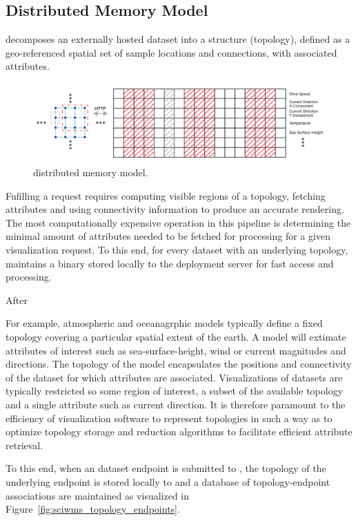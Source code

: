 \subsection{Distributed Memory Model}
\sciwms{} decomposes an externally hosted dataset into a structure
(topology), defined as a geo-referenced spatial set of sample
locations and connections, with associated attributes.

\begin{figure}[ht!]
  \centering
  \includegraphics[width=\textwidth]{../figs/topology_memModel}
  \caption{\sciwms{} distributed memory model.}
  \label{fig:sciwms_mem_model}
\end{figure}

Fufilling a \wms{} request requires computing visible regions of a
topology, fetching attributes and using connectivity information to
produce an accurate rendering. The most computationally expensive
operation in this pipeline is determining the minimal amount of
attributes needed to be fetched for processing for a given
visualization request. To this end, for every dataset with an
underlying \ugrid{} topology, \sciwms{} maintains a binary \rtree{}
stored locally to the \sciwms{} deployment server for fast access and
processing.

After

For example, atmospheric and oceanagrphic models typically define a
fixed topology covering a particular spatial extent of the earth. A
model will extimate attributes of interest such as sea-surface-height,
wind or current magnitudes and directions. The topology of the model
encapsulates the positions and connectivity of the dataset for which
attributes are associated. Visualizations of datasets are typically
restricted so some region of interest, a subset of the available
topology and a single attribute such as current direction. It is
therefore paramount to the efficiency of visualization software to
represent topologies in such a way as to optimize topology storage and
reduction algorithms to facilitate efficient attribute retrieval.

To this end, when an dataset endpoint is submitted to \sciwms{}, the
topology of the underlying endpoint is stored locally to \sciwms{} and
a database of topology-endpoint associations are maintained as
visualized in Figure~\ref{fig:sciwms_topology_endpoints}. 

